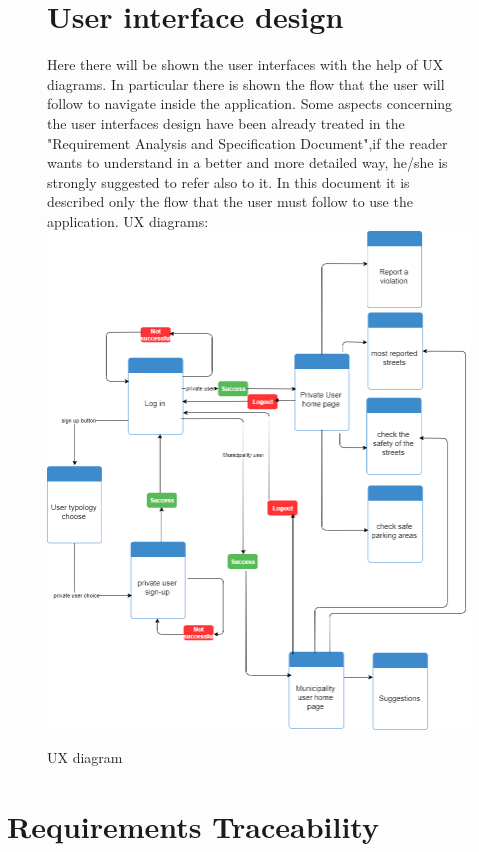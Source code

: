 \documentclass[titlepage]{article}
\begin{document}
\begin{figure}[h]
	\section{User interface design}
Here there will be shown the user interfaces with the help of UX diagrams. In particular there is shown the flow that the user will follow to navigate inside the application. Some aspects concerning the user interfaces design have been already treated in the "Requirement Analysis and Specification Document",if the reader wants to understand in a better and more detailed way, he/she is strongly suggested to refer also to it. In this document it is described only the flow that the user must follow to use the application.
UX diagrams:\\
	\includegraphics[scale=0.48]{Diagrams/UX diagram.png}
	\caption{UX diagram}
\end{figure}
\FloatBarrier

\section{ Requirements Traceability}
\end{document}
